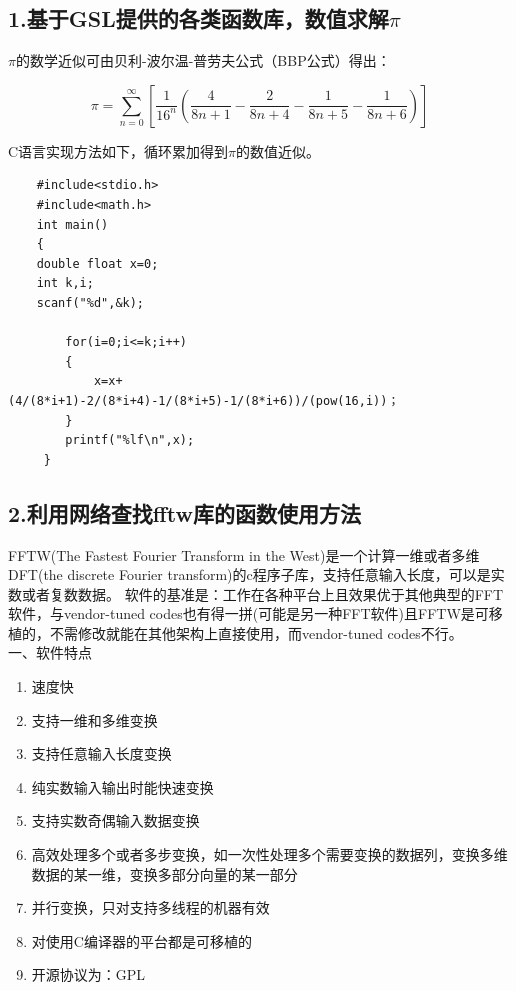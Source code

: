 \documentclass[10pt,a4paper,twoside,UTF8]{ctexart}
\begin{document}
\subsection*{1.基于GSL提供的各类函数库，数值求解$\pi$}
$\pi$的数学近似可由贝利-波尔温-普劳夫公式（BBP公式）得出：

\begin{equation*}
    \pi=\sum_{n = 0}^{\infty}  \left[\frac{1}{16^n} \left( \frac{4}{8n+1}-\frac{2}{8n+4}-\frac{1}{8n+5}-\frac{1}{8n+6}\right) \right] 
\end{equation*}

C语言实现方法如下，循环累加得到$\pi$的数值近似。\\

\begin{lstlisting}
    #include<stdio.h>
    #include<math.h>
    int main()
    {
    double float x=0;
    int k,i;
    scanf("%d",&k);
        
        for(i=0;i<=k;i++)
        {
            x=x+(4/(8*i+1)-2/(8*i+4)-1/(8*i+5)-1/(8*i+6))/(pow(16,i))；
        }
        printf("%lf\n",x);
     } 
\end{lstlisting}
\subsection*{2.利用网络查找fftw库的函数使用方法}
FFTW(The Fastest Fourier Transform in the West)是一个计算一维或者多维DFT(the discrete Fourier transform)的c程序子库，支持任意输入长度，可以是实数或者复数数据。
软件的基准是：工作在各种平台上且效果优于其他典型的FFT软件，与vendor-tuned codes也有得一拼(可能是另一种FFT软件)且FFTW是可移植的，不需修改就能在其他架构上直接使用，而vendor-tuned codes不行。\\

一、软件特点
\begin{enumerate}
    \item 速度快
    \item 支持一维和多维变换
    \item 支持任意输入长度变换
    \item 纯实数输入输出时能快速变换
    \item 支持实数奇偶输入数据变换
    \item 高效处理多个或者多步变换，如一次性处理多个需要变换的数据列，变换多维数据的某一维，变换多部分向量的某一部分
    \item 并行变换，只对支持多线程的机器有效
    \item 对使用C编译器的平台都是可移植的
    \item 开源协议为：GPL
\end{enumerate}
\end{document}
